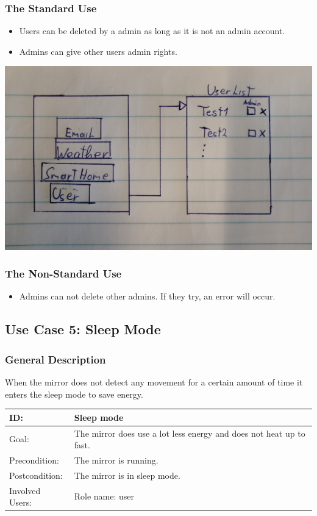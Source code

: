 \documentclass[12pt]{article}
\theoremstyle{definition}
\begin{document}
\subsubsection{The Standard Use}
\begin{itemize}
    \item Users can be deleted by a admin as long as it is not an admin account.
    \item Admins can give other users admin rights.
\end{itemize}
\includegraphics[scale=.1]{UseCase/UserAdministration.jpg}\\

\subsubsection{The Non-Standard Use}
\begin{itemize}
    \item Admins can not delete other admins. If they try, an error  will occur.  
\end{itemize}

\subsection{Use Case 5: Sleep Mode}
\subsubsection{General Description}
When the mirror does not detect any movement for a certain amount of time it enters the sleep mode to save energy. \\

\begin{tabular}{|p{.2\linewidth}|p{.65\linewidth}|}
\hline 
ID: & Sleep mode\\ \hline
Goal: & The mirror does use a lot less energy and does not heat up to fast.\\ \hline
Precondition: & The mirror is running. \\ \hline
Postcondition: & The mirror is in sleep mode. \\ \hline
Involved Users: & Role name: user \\ \hline
\end{tabular}
\end{document}
